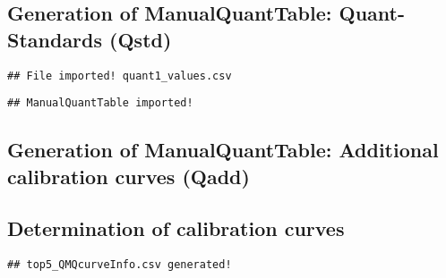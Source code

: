 \documentclass[9pt,]{article}
\begin{document}
\subsection{Generation of ManualQuantTable: Quant-Standards
(Qstd)}\label{generation-of-manualquanttable-quant-standards-qstd}

\begin{verbatim}
## File imported! quant1_values.csv
\end{verbatim}

\begin{verbatim}
## ManualQuantTable imported!
\end{verbatim}

\subsection{Generation of ManualQuantTable: Additional calibration
curves
(Qadd)}\label{generation-of-manualquanttable-additional-calibration-curves-qadd}

\subsection{Determination of calibration
curves}\label{determination-of-calibration-curves}

\begin{verbatim}
## top5_QMQcurveInfo.csv generated!
\end{verbatim}
\end{document}
